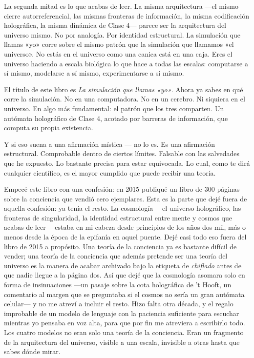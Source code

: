 \documentclass[11pt, twoside, openright]{book}
\begin{document}
La segunda mitad es lo que acabas de leer. La misma arquitectura ---el mismo cierre autorreferencial, las mismas fronteras de información, la misma codificación holográfica, la misma dinámica de Clase 4--- parece ser la arquitectura del universo mismo. No por analogía. Por identidad estructural. La simulación que llamas «yo» corre sobre el mismo patrón que la simulación que llamamos «el universo». No estás en el universo como una canica está en una caja. Eres el universo haciendo a escala biológica lo que hace a todas las escalas: computarse a sí mismo, modelarse a sí mismo, experimentarse a sí mismo.

El título de este libro es \textit{La simulación que llamas «yo»}. Ahora ya sabes en qué corre la simulación. No en una computadora. No en un cerebro. Ni siquiera en el universo. En algo más fundamental: el patrón que los tres comparten. Un autómata holográfico de Clase 4, acotado por barreras de información, que computa su propia existencia.

Y si eso suena a una afirmación mística --- no lo es. Es una afirmación estructural. Comprobable dentro de ciertos límites. Falsable con las salvedades que he expuesto. Lo bastante precisa para estar equivocada. Lo cual, como te dirá cualquier científico, es el mayor cumplido que puede recibir una teoría.

Empecé este libro con una confesión: en 2015 publiqué un libro de 300 páginas sobre la conciencia que vendió cero ejemplares. Esta es la parte que dejé fuera de aquella confesión: ya tenía el resto. La cosmología ---el universo holográfico, las fronteras de singularidad, la identidad estructural entre mente y cosmos que acabas de leer--- estaba en mi cabeza desde principios de los años dos mil, más o menos desde la época de la epifanía en aquel puente. Dejé casi todo eso fuera del libro de 2015 a propósito. Una teoría de la conciencia ya es bastante difícil de vender; una teoría de la conciencia que además pretende ser una teoría del universo es la manera de acabar archivado bajo la etiqueta de \textit{chiflado} antes de que nadie llegue a la página dos. Así que dejé que la cosmología asomara solo en forma de insinuaciones ---un pasaje sobre la cota holográfica de 't Hooft, un comentario al margen que se preguntaba si el cosmos no sería un gran autómata celular--- y no me atreví a incluir el resto. Hizo falta otra década, y el regalo improbable de un modelo de lenguaje con la paciencia suficiente para escuchar mientras yo pensaba en voz alta, para que por fin me atreviera a escribirlo todo. Los cuatro modelos no eran solo una teoría de la conciencia. Eran un fragmento de la arquitectura del universo, visible a una escala, invisible a otras hasta que sabes dónde mirar.
\end{document}
